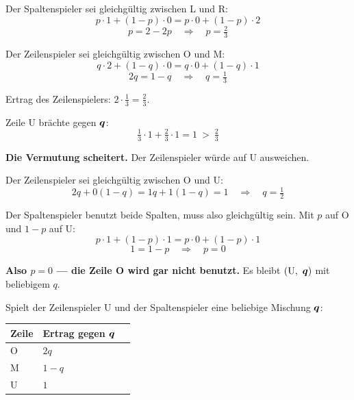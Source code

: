 \begin{aufgabe}
Der Spaltenspieler sei gleichgültig zwischen L und R:
\[ p\cdot1 + (1-p)\cdot0 = p\cdot0 + (1-p)\cdot2 \]
\[ p = 2-2p \quad\Longrightarrow\quad p = \tfrac23 \]

Der Zeilenspieler sei gleichgültig zwischen O und M:
\[ q\cdot2 + (1-q)\cdot0 = q\cdot0 + (1-q)\cdot1 \]
\[ 2q = 1-q \quad\Longrightarrow\quad q = \tfrac13 \]

Ertrag des Zeilenspielers: $2\cdot\tfrac13 = \tfrac23$.

Zeile U brächte gegen $\boldsymbol{q}$:
\[ \tfrac13\cdot1 + \tfrac23\cdot1 = 1 \ >\ \tfrac23 \]

\begin{center}
\begin{minipage}{0.9\textwidth}
\textcolor{akzent}{\textbf{Die Vermutung scheitert.}} Der Zeilenspieler würde auf U ausweichen.
\end{minipage}
\end{center}

Der Zeilenspieler sei gleichgültig zwischen O und U:
\[ 2q + 0(1-q) = 1q + 1(1-q) = 1 \quad\Longrightarrow\quad q = \tfrac12 \]

Der Spaltenspieler benutzt beide Spalten, muss also gleichgültig sein. Mit $p$ auf O und $1-p$ auf U:
\[ p\cdot1 + (1-p)\cdot1 = p\cdot0 + (1-p)\cdot1 \]
\[ 1 = 1-p \quad\Longrightarrow\quad p = 0 \]

\begin{center}
\begin{minipage}{0.9\textwidth}
\textbf{Also $p=0$ --- die Zeile O wird gar nicht benutzt.} Es bleibt $(\text{U},\ \boldsymbol{q})$ mit beliebigem $q$.
\end{minipage}
\end{center}

Spielt der Zeilenspieler U und der Spaltenspieler eine beliebige Mischung $\boldsymbol{q}$:

\begin{center}
\renewcommand{\arraystretch}{1.48}
\begin{tabular}{@{}P{1.8cm}P{2.8cm}P{2.4cm}@{}}
\toprule
\textbf{Zeile} & \textbf{Ertrag gegen $\boldsymbol{q}$} & \\
\midrule
O & $2q$ & \\
M & $1-q$ & \\
U & $1$ & \\
\bottomrule
\end{tabular}
\end{center}


\end{aufgabe}
